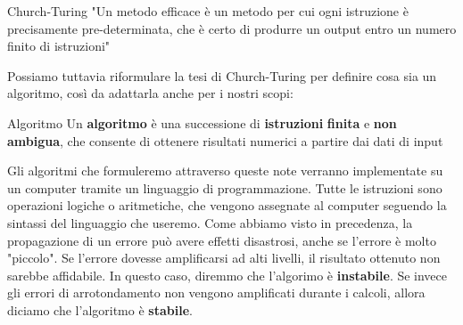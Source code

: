 \begin{quotebox}{Church-Turing}
    "Un metodo efficace è un metodo per cui ogni istruzione è precisamente pre-determinata, che è certo di produrre un output entro un numero finito di istruzioni"
\end{quotebox}

Possiamo tuttavia riformulare la tesi di Church-Turing per definire cosa sia un algoritmo, così da adattarla anche per i nostri scopi:

\begin{definition}{Algoritmo}
    Un \textbf{algoritmo} è una successione di \textbf{istruzioni} \textbf{finita} e \textbf{non ambigua}, che consente di ottenere risultati numerici a partire dai dati di input
\end{definition}

Gli algoritmi che formuleremo attraverso queste note verranno implementate su un computer tramite un linguaggio di programmazione. Tutte le istruzioni sono operazioni logiche o aritmetiche, che vengono assegnate al computer seguendo la sintassi del linguaggio che useremo.
\nwl
Come abbiamo visto in precedenza, la propagazione di un errore può avere effetti disastrosi, anche se l'errore è molto "piccolo". Se l'errore dovesse amplificarsi ad alti livelli, il risultato ottenuto non sarebbe affidabile. In questo caso, diremmo che l'algorimo è \textbf{instabile}. Se invece gli errori di arrotondamento non vengono amplificati durante i calcoli, allora diciamo che l'algoritmo è \textbf{stabile}.

